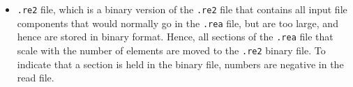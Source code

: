 \documentclass[10pt]{article}
\numberwithin{equation}{section} %
\begin{document}
\begin{itemize}
\begin{lstlisting}[language=Fortran]
! specify output fields. You must set the coordinates to true if you want any mesh modifications made in the user file to be recognizable to postx. 
  ***** OUTPUT FIELD SPECIFICATION *****
           6  SPECIFICATIONS FOLLOW
 T       COORDINATES
 T       VELOCITY
 T       PRESSURE
 T       TEMPERATURE
 F       TEMPERATURE GRADIENT
           0       PASSIVE SCALARS
  ***** OBJECT SPECIFICATION *****
       0 Surface Objects
       0 Volume  Objects
       0 Edge    Objects
       0 Point   Objects
\end{lstlisting}

\item {\tt .re2} file, which is a binary version of the {\tt .re2} file that contains all input file components that would normally go in the {\tt .rea} file, but are too large, and hence are stored in binary format. Hence, all sections of the {\tt .rea} file that scale with the number of elements are moved to the {\tt .re2} binary file. To indicate that a section is held in the binary file, numbers are negative in the read file.


\end{itemize}
\end{document}
